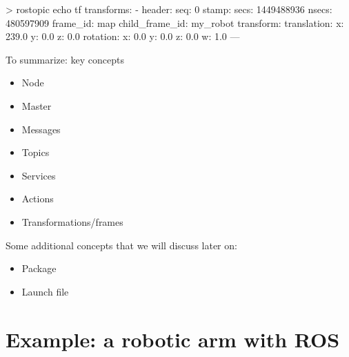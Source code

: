 \documentclass[compress]{beamer}
\begin{document}
%
%
%
%

\begin{frame}[containsverbatim]{}
\begin{shcode}
> rostopic echo tf
transforms: 
  - 
    header: 
      seq: 0
      stamp: 
        secs: 1449488936
        nsecs: 480597909
      frame_id: map
    child_frame_id: my_robot
    transform: 
      translation: 
        x: 239.0
        y: 0.0
        z: 0.0
      rotation: 
        x: 0.0
        y: 0.0
        z: 0.0
        w: 1.0
---

\end{shcode}

\end{frame}

\begin{frame}{To summarize: key concepts}
    \begin{itemize}
        \item Node
        \item Master
        \item Messages
        \item Topics
        \item Services
        \item Actions
        \item Transformations/frames
    \end{itemize}

    \pause

    Some additional concepts that we will discuss later on:
    \begin{itemize}
        \item Package
        \item Launch file
    \end{itemize}
\end{frame}


\section[Robot arm]{Example: a robotic arm with ROS}
\end{document}

